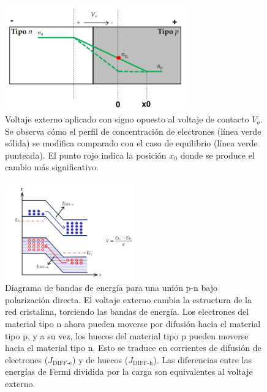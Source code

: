 \documentclass[
    10pt,
    aspectratio=169,
    xcolor={dvipsnames},
    spanish,
    ]{beamer}
\begin{document}
\begin{frame}
    \begin{figure}[H]
        \centering
        \includegraphics[width=0.7\textwidth]{../figures/Auxiliar_2_11}
        \caption{Voltaje externo aplicado con signo opuesto al voltaje de contacto $V_o$. Se observa cómo el perfil de concentración de electrones (línea verde sólida) se modifica comparado con el caso de equilibrio (línea verde punteada). El punto rojo indica la posición $x_0$ donde se produce el cambio más significativo.}
        \label{fig:voltaje_externo}
    \end{figure}
\end{frame}
\begin{frame}
     \begin{figure}[H]
        \centering
        \includegraphics[width=0.5\textwidth]{../figures/Auxiliar_2_12}
        \caption{Diagrama de bandas de energía para una unión p-n bajo polarización directa. El voltaje externo cambia la estructura de la red cristalina, torciendo las bandas de energía. Los electrones del material tipo n ahora pueden moverse por difusión hacia el material tipo p, y a su vez, los huecos del material tipo p pueden moverse hacia el material tipo n. Esto se traduce en corrientes de difusión de electrones ($J_{\text{DIFF-e}}$) y de huecos ($J_{\text{DIFF-h}}$). Las diferencias entre las energías de Fermi dividida por la carga son equivalentes al voltaje externo.}
        \label{fig:bandas_polarizacion}
    \end{figure}
\end{frame}
\end{document}

